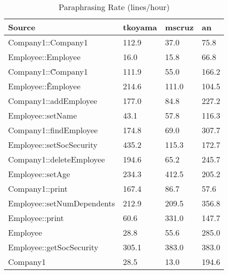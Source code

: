 \begin{table}[hb]
\begin{center}
\begin{tabular}{|l|l|l|l|}
\hline
Source & tkoyama & mscruz & an\\
\hline
Company1::Company1 & 112.9 & 37.0 & 75.8\\
Employee::Employee & 16.0 & 15.8 & 66.8\\
Company1::\~Company1 & 111.9 & 55.0 & 166.2\\
Employee::\~Employee & 214.6 & 111.0 & 104.5\\
Company1::addEmployee & 177.0 & 84.8 & 227.2\\
Employee::setName & 43.1 & 57.8 & 116.3\\
Company1::findEmployee & 174.8 & 69.0 & 307.7\\
Employee::setSocSecurity & 435.2 & 115.3 & 172.7\\
Company1::deleteEmployee & 194.6 & 65.2 & 245.7\\
Employee::setAge & 234.3 & 412.5 & 205.2\\
Company1::print & 167.4 & 86.7 & 57.6\\
Employee::setNumDependents & 212.9 & 209.5 & 356.8\\
Employee::print & 60.6 & 331.0 & 147.7\\
Employee & 28.8 & 55.6 & 285.0\\
Employee::getSocSecurity & 305.1 & 383.0 & 383.0\\
Company1 & 28.5 & 13.0 & 194.6\\
\hline
\end{tabular}
\end{center}
\caption{Paraphrasing Rate (lines/hour)}
\end{table}

